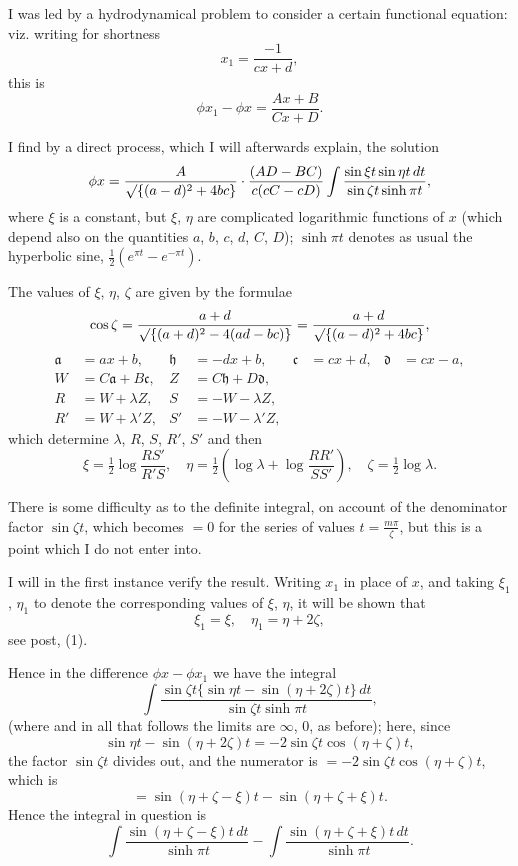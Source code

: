 \documentclass[12pt,a4paper]{article}
\theoremstyle{cayley}
\theoremstyle{definition}
\numberwithin{equation}{section}
\begin{document}
I was led by a hydrodynamical problem to consider a certain functional equation: viz. writing for shortness
\[
x_1 = \frac{-1}{cx + d},
\]
this is
\[
\phi x_1 - \phi x = \frac{Ax + B}{Cx + D}.
\]

I find by a direct process, which I will afterwards explain, the solution
\[
\phi x = \frac{A}{\surd\{(a - d)^2 + 4bc\}} \cdot \frac{(AD - BC)}{c(cC - cD)} \int \frac{\sin \xi t \sin \eta t \, dt}{\sin \zeta t \sinh \pi t},
\]
where $\xi$ is a constant, but $\xi$, $\eta$ are complicated logarithmic functions of $x$ (which depend also on the quantities $a$, $b$, $c$, $d$, $C$, $D$); $\sinh \pi t$ denotes as usual the hyperbolic sine, $\tfrac{1}{2}(e^{\pi t} - e^{-\pi t})$.

The values of $\xi$, $\eta$, $\zeta$ are given by the formulae
\[
\cos \zeta = \frac{a + d}{\surd\{(a + d)^2 - 4(ad - bc)\}} = \frac{a + d}{\surd\{(a - d)^2 + 4bc\}},
\]
\begin{align*}
\mathfrak{a} &= ax + b, & \mathfrak{h} &= -dx + b, & \mathfrak{c} &= cx + d, & \mathfrak{d} &= cx - a, \\
W &= C\mathfrak{a} + B\mathfrak{c}, & Z &= C\mathfrak{h} + D\mathfrak{d}, & \\
R &= W + \lambda Z, & S &= -W - \lambda Z, & \\
R' &= W + \lambda' Z, & S' &= -W - \lambda' Z, &
\end{align*}
which determine $\lambda$, $R$, $S$, $R'$, $S'$ and then
\[
\xi = \tfrac{1}{2} \log \frac{RS'}{R'S}, \quad \eta = \tfrac{1}{2} \left(\log \lambda + \log \frac{RR'}{SS'}\right), \quad \zeta = \tfrac{1}{2} \log \lambda.
\]

There is some difficulty as to the definite integral, on account of the denominator factor $\sin \zeta t$, which becomes $= 0$ for the series of values $t = \frac{m\pi}{\zeta}$, but this is a point which I do not enter into.

I will in the first instance verify the result. Writing $x_1$ in place of $x$, and taking $\xi_1$, $\eta_1$ to denote the corresponding values of $\xi$, $\eta$, it will be shown that
\[
\xi_1 = \xi, \quad \eta_1 = \eta + 2\zeta,
\]
see post, (1).

Hence in the difference $\phi x - \phi x_1$ we have the integral
\[
\int \frac{\sin \zeta t \{\sin \eta t - \sin(\eta + 2\zeta)t\} \, dt}{\sin \zeta t \sinh \pi t},
\]
(where and in all that follows the limits are $\infty$, $0$, as before); here, since
\[
\sin \eta t - \sin(\eta + 2\zeta)t = -2\sin \zeta t \cos(\eta + \zeta)t,
\]
the factor $\sin \zeta t$ divides out, and the numerator is $= -2\sin \zeta t \cos(\eta + \zeta)t$, which is
\[
= \sin(\eta + \zeta - \xi)t - \sin(\eta + \zeta + \xi)t.
\]
Hence the integral in question is
\[
\int \frac{\sin(\eta + \zeta - \xi)t \, dt}{\sinh \pi t} - \int \frac{\sin(\eta + \zeta + \xi)t \, dt}{\sinh \pi t}.
\]
\end{document}
